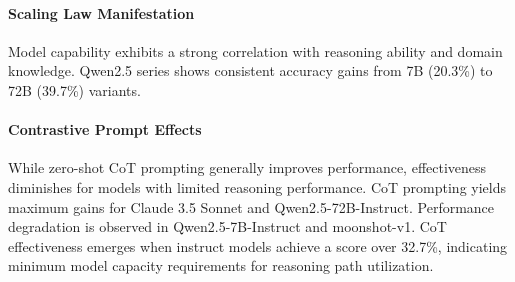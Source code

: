\paragraph{Scaling Law Manifestation} 
Model capability exhibits a strong correlation with reasoning ability and domain knowledge. 
Qwen2.5 series shows consistent accuracy gains from 7B (20.3\%) to 72B (39.7\%) variants.

\paragraph{Contrastive Prompt Effects}
While zero-shot CoT prompting \cite{kojima2023largelanguagemodelszeroshot} generally improves performance, effectiveness diminishes for models with limited reasoning performance. 
CoT prompting yields maximum gains for Claude 3.5 Sonnet and Qwen2.5-72B-Instruct.
Performance degradation is observed in Qwen2.5-7B-Instruct and moonshot-v1.
CoT effectiveness emerges when instruct models achieve a score over 32.7\%, indicating minimum model capacity requirements for reasoning path utilization.


